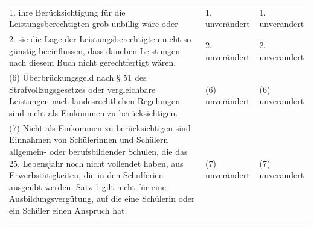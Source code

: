 \documentclass[10pt,a4paper,landscape]{article}
\begin{document}
\begin{longtable}{|L{8.2cm}|L{8.2cm}|L{8.2cm}|}
\hhline{|---|}
1.   \newline ihre Berücksichtigung für die  \newline Leistungsberechtigten grob unbillig wäre  \newline oder & 1. unverändert & 1. unverändert \\
\hhline{|---|}
2.   \newline sie die Lage der Leistungsberechtigten  \newline nicht so günstig beeinflussen, dass  \newline daneben Leistungen nach diesem Buch  \newline nicht gerechtfertigt wären. & 2. unverändert & 2. unverändert \\
\hhline{|---|}
(6) Überbrückungsgeld nach \S{} 51 des  \newline Strafvollzugsgesetzes oder vergleichbare  \newline Leistungen nach landesrechtlichen  \newline Regelungen sind nicht als Einkommen zu  \newline berücksichtigen. & (6) unverändert & (6) unverändert \\
\hhline{|---|}
(7) Nicht als Einkommen zu  \newline berücksichtigen sind Einnahmen von  \newline Schülerinnen und Schülern allgemein- oder  \newline berufsbildender Schulen, die das 25.  \newline Lebensjahr noch nicht vollendet haben, aus  \newline Erwerbstätigkeiten, die in den Schulferien  \newline ausgeübt werden. Satz 1 gilt nicht für eine  \newline Ausbildungsvergütung, auf die eine  \newline Schülerin oder ein Schüler einen Anspruch  \newline hat. & (7) unverändert & (7) unverändert \\
\hhline{|---|}
\end{longtable}
\newpage
\end{document}

